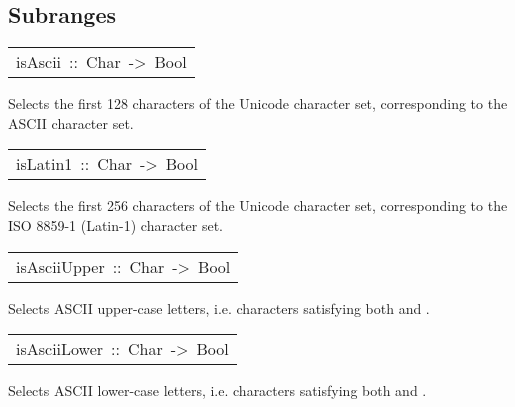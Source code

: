 \subsection{Subranges
}
\begin{haddockdesc}
\item[\begin{tabular}{@{}l}
isAscii\ ::\ Char\ ->\ Bool
\end{tabular}]\haddockbegindoc
Selects the first 128 characters of the Unicode character set,
 corresponding to the ASCII character set.
\par

\end{haddockdesc}
\begin{haddockdesc}
\item[\begin{tabular}{@{}l}
isLatin1\ ::\ Char\ ->\ Bool
\end{tabular}]\haddockbegindoc
Selects the first 256 characters of the Unicode character set,
 corresponding to the ISO 8859-1 (Latin-1) character set.
\par

\end{haddockdesc}
\begin{haddockdesc}
\item[\begin{tabular}{@{}l}
isAsciiUpper\ ::\ Char\ ->\ Bool
\end{tabular}]\haddockbegindoc
Selects ASCII upper-case letters,
 i.e. characters satisfying both  and .
\par

\end{haddockdesc}
\begin{haddockdesc}
\item[\begin{tabular}{@{}l}
isAsciiLower\ ::\ Char\ ->\ Bool
\end{tabular}]\haddockbegindoc
Selects ASCII lower-case letters,
 i.e. characters satisfying both  and .
\par

\end{haddockdesc}
